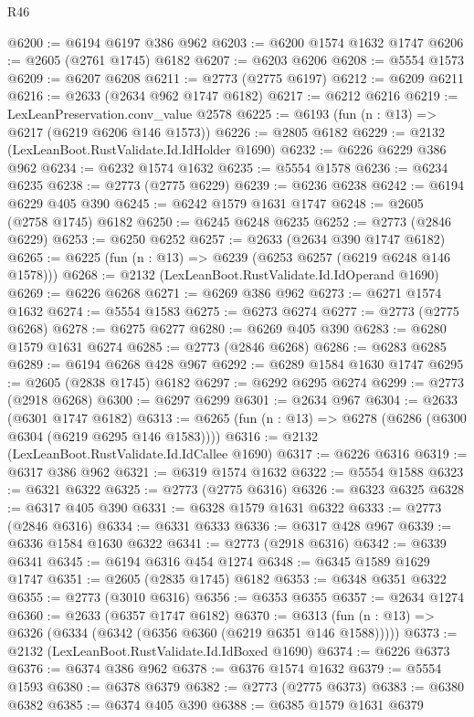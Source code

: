 \begin{lexlean}{R46}
\begin{coremodule}
@6200 := @6194 @6197 @386 @962
@6203 := @6200 @1574 @1632 @1747
@6206 := @2605 (@2761 @1745) @6182
@6207 := @6203 @6206
@6208 := @5554 @1573
@6209 := @6207 @6208
@6211 := @2773 (@2775 @6197)
@6212 := @6209 @6211
@6216 := @2633 (@2634 @962 @1747 @6182)
@6217 := @6212 @6216
@6219 := LexLeanPreservation.conv_value @2578
@6225 := @6193 (fun (n : @13) => @6217 (@6219 @6206 @146 @1573))
@6226 := @2805 @6182
@6229 := @2132 (LexLeanBoot.RustValidate.Id.IdHolder @1690)
@6232 := @6226 @6229 @386 @962
@6234 := @6232 @1574 @1632
@6235 := @5554 @1578
@6236 := @6234 @6235
@6238 := @2773 (@2775 @6229)
@6239 := @6236 @6238
@6242 := @6194 @6229 @405 @390
@6245 := @6242 @1579 @1631 @1747
@6248 := @2605 (@2758 @1745) @6182
@6250 := @6245 @6248 @6235
@6252 := @2773 (@2846 @6229)
@6253 := @6250 @6252
@6257 := @2633 (@2634 @390 @1747 @6182)
@6265 := @6225 (fun (n : @13) => @6239 (@6253 @6257 (@6219 @6248 @146 @1578)))
@6268 := @2132 (LexLeanBoot.RustValidate.Id.IdOperand @1690)
@6269 := @6226 @6268
@6271 := @6269 @386 @962
@6273 := @6271 @1574 @1632
@6274 := @5554 @1583
@6275 := @6273 @6274
@6277 := @2773 (@2775 @6268)
@6278 := @6275 @6277
@6280 := @6269 @405 @390
@6283 := @6280 @1579 @1631 @6274
@6285 := @2773 (@2846 @6268)
@6286 := @6283 @6285
@6289 := @6194 @6268 @428 @967
@6292 := @6289 @1584 @1630 @1747
@6295 := @2605 (@2838 @1745) @6182
@6297 := @6292 @6295 @6274
@6299 := @2773 (@2918 @6268)
@6300 := @6297 @6299
@6301 := @2634 @967
@6304 := @2633 (@6301 @1747 @6182)
@6313 := @6265 (fun (n : @13) => @6278 (@6286 (@6300 @6304 (@6219 @6295 @146 @1583))))
@6316 := @2132 (LexLeanBoot.RustValidate.Id.IdCallee @1690)
@6317 := @6226 @6316
@6319 := @6317 @386 @962
@6321 := @6319 @1574 @1632
@6322 := @5554 @1588
@6323 := @6321 @6322
@6325 := @2773 (@2775 @6316)
@6326 := @6323 @6325
@6328 := @6317 @405 @390
@6331 := @6328 @1579 @1631 @6322
@6333 := @2773 (@2846 @6316)
@6334 := @6331 @6333
@6336 := @6317 @428 @967
@6339 := @6336 @1584 @1630 @6322
@6341 := @2773 (@2918 @6316)
@6342 := @6339 @6341
@6345 := @6194 @6316 @454 @1274
@6348 := @6345 @1589 @1629 @1747
@6351 := @2605 (@2835 @1745) @6182
@6353 := @6348 @6351 @6322
@6355 := @2773 (@3010 @6316)
@6356 := @6353 @6355
@6357 := @2634 @1274
@6360 := @2633 (@6357 @1747 @6182)
@6370 := @6313 (fun (n : @13) => @6326 (@6334 (@6342 (@6356 @6360 (@6219 @6351 @146 @1588)))))
@6373 := @2132 (LexLeanBoot.RustValidate.Id.IdBoxed @1690)
@6374 := @6226 @6373
@6376 := @6374 @386 @962
@6378 := @6376 @1574 @1632
@6379 := @5554 @1593
@6380 := @6378 @6379
@6382 := @2773 (@2775 @6373)
@6383 := @6380 @6382
@6385 := @6374 @405 @390
@6388 := @6385 @1579 @1631 @6379

\end{coremodule}
\end{lexlean}
